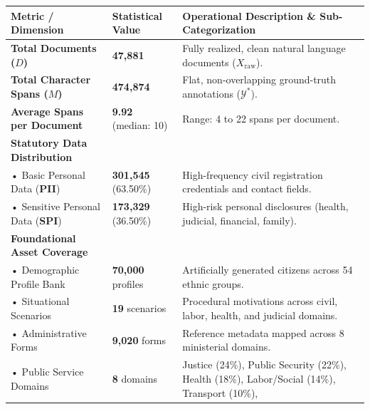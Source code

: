 \documentclass[
]{article}
\newcounter{none} %
\begin{document}
{\def\LTcaptype{none} %
\begin{longtable}[]{@{}
  >{\raggedright\arraybackslash}p{}
  >{\centering\arraybackslash}p{}
  >{\raggedright\arraybackslash}p{}@{}}
\toprule\noalign{}
\begin{minipage}[b]{\linewidth}\raggedright
Metric / Dimension
\end{minipage} & \begin{minipage}[b]{\linewidth}\centering
Statistical Value
\end{minipage} & \begin{minipage}[b]{\linewidth}\raggedright
Operational Description \& Sub-Categorization
\end{minipage} \\
\midrule\noalign{}
\endhead
\bottomrule\noalign{}
\endlastfoot
\textbf{Total Documents (\(D\))} & \textbf{47,881} & Fully realized,
clean natural language documents (\(X_{\text{raw}}\)). \\
\textbf{Total Character Spans (\(M\))} & \textbf{474,874} & Flat,
non-overlapping ground-truth annotations (\(\mathcal{Y}^*\)). \\
\textbf{Average Spans per Document} & \textbf{9.92} (median: 10) &
Range: 4 to 22 spans per document. \\
\textbf{Statutory Data Distribution} & & \\
• Basic Personal Data (\textbf{PII}) & \textbf{301,545} (63.50\%) &
High-frequency civil registration credentials and contact fields. \\
• Sensitive Personal Data (\textbf{SPI}) & \textbf{173,329} (36.50\%) &
High-risk personal disclosures (health, judicial, financial, family). \\
\textbf{Foundational Asset Coverage} & & \\
• Demographic Profile Bank & \textbf{70,000} profiles & Artificially
generated citizens across 54 ethnic groups. \\
• Situational Scenarios & \textbf{19} scenarios & Procedural motivations
across civil, labor, health, and judicial domains. \\
• Administrative Forms & \textbf{9,020} forms & Reference metadata
mapped across 8 ministerial domains. \\
• Public Service Domains & \textbf{8} domains & Justice (24\%), Public
Security (22\%), Health (18\%), Labor/Social (14\%), Transport (10\%),

\end{longtable}}
\end{document}
